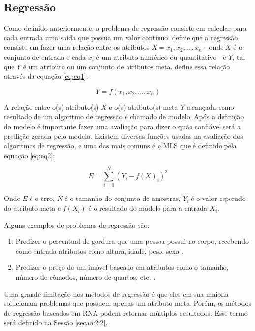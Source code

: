 \vspace{-1cm}
\subsection{Regressão}
\label{subsecao:2:1:1}

Como definido anteriormente, o problema de regressão consiste em calcular para cada entrada uma saída que possua um valor contínuo.  define que a regressão consiste em fazer uma relação entre os atributos $X={x_1, x_2,..., x_n}$ - onde $X$ é o conjunto de entrada e cada $x_i$ é um atributo numérico ou quantitativo - e $Y$, tal que $Y$ é um atributo ou um conjunto de atributos meta.  define essa relação através da equação \ref{eq:eq1}:

\begin{equation}
\label{eq:eq1}
	Y = f(x_1, x_2,..., x_n)
\end{equation}

A relação entre o(s) atributo(s) $X$ e o(s) atributo(s)-meta $Y$ alcançada como resultado de um algoritmo de regressão é chamado de modelo. Após a definição do modelo é importante fazer uma avaliação para dizer o quão confiável será a predição gerada pelo modelo. Existem diversas funções usadas na avaliação dos algoritmos de regressão, e uma das mais comuns é o \ac{MLS} que é definido pela equação \ref{eq:eq2}:

\begin{equation}
\label{eq:eq2}
	E = \sum_{i = 0}^{N}(Y_i - f(X)_i)^2
\end{equation}

Onde $E$ é o erro, $N$ é o tamanho do conjunto de amostras, $Y_i$ é o valor esperado do atributo-meta e $f(X_i)$ é o resultado do modelo para a entrada $X_i$.

Alguns exemplos de problemas de regressão são: 

\begin{enumerate}
	\item Predizer o percentual de gordura que uma pessoa possui no corpo, recebendo como entrada atributos como altura, idade, peso, sexo \cite{dosualdo-2003}.
	\item Predizer o preço de um imóvel baseado em atributos como o tamanho, número de cômodos, número de quartos, etc. \cite{pereira-2012}.
\end{enumerate}

Uma grande limitação nos métodos de regressão é que eles em sua maioria solucionam problemas que possuem apenas um atributo-meta. Porém, os métodos de regressão baseados em \ac{RNA} podem retornar múltiplos resultados. Esse termo será definido na Sessão \ref{secao:2:2}.

